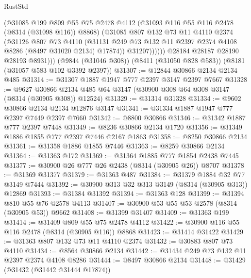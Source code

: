 \begin{lexlean}{RustStd}
\begin{coremodule}
                  (@31085
                    @199
                    @809
                    @55
                    @75
                    @2478
                    @4112
                    (@31093 @116 @55 @116 @2478 (@8314 (@31098 @116)) @8868)
                    (@31085
                      @807
                      @132
                      @73
                      @11
                      @4110
                      @2374
                      (@31126
                        @807
                        @73
                        @4110
                        (@31131
                          @249
                          @73
                          @132
                          @11
                          @2397
                          @2374
                          @4108
                          @8286
                          (@8497 @31020 @2134)
                          @17874))
                      @31207))))))
          @28184
          @28187
          @28190
          @28193
          @8931)))
    (@9844 (@31046 @308))
    (@8411 (@31050 @828 @583))
    (@8181 (@31057 @583 @102 @3392 @2397))
@31307 := @12844 @30866 @2134 @2134 @485
@31314 := @31307 @1887 @1947 @777 @2397 @3147 @2397 @7667
@31328 := @9627
    @30866
    @2134
    @485
    @64
    @3147
    (@30900 @308 @64 @308 @3147 (@8314 (@30905 @308)) @12524)
@31329 := @31314 @31328
@31334 := @9602 @30866 @2134 @2134 @12876 @3147
@31341 := @31334 @1887 @1947 @777 @2397 @7449 @2397 @7660
@31342 := @8800 @30866
@31346 := @31342 @1887 @777 @2397 @7448
@31349 := @8236 @30866 @2134 @1720
@31356 := @31349 @1886 @1855 @777 @2397 @7446 @2167 @1863
@31358 := @8250 @30866 @2134
@31361 := @31358 @1886 @1855 @7446
@31363 := @8259 @30866 @2134
@31364 := @31363 @172
@31369 := @31364 @1885 @777 @1854 @2438 @7445
@31377 := @30900 @26 @777 @26 @2438 (@8314 (@30905 @26)) @8707
@31378 := @31369 @31377
@31379 := @31363 @487
@31384 := @31379 @1884 @32 @77 @3149 @7444
@31392 := @30900 @313 @32 @313 @3149 (@8314 (@30905 @313)) @12869
@31393 := @31384 @31392
@31394 := @31363 @128
@31399 := @31394 @810 @55 @76 @2578 @4113
@31407 := @30900 @53 @55 @53 @2578 (@8314 (@30905 @53)) @9662
@31408 := @31399 @31407
@31409 := @31363 @199
@31414 := @31409 @809 @55 @75 @2478 @4112
@31422 := @30900 @116 @55 @116 @2478 (@8314 (@30905 @116)) @8868
@31423 := @31414 @31422
@31429 := @31363 @807 @132 @73 @11 @4110 @2374
@31432 := @30883 @807 @73 @4110
@31434 := @8564 @30866 @2134
@31442 := @31434 @249 @73 @132 @11 @2397 @2374 @4108 @8286
@31444 := @8497 @30866 @2134
@31448 := @31429 (@31432 (@31442 @31444 @17874))

\end{coremodule}
\end{lexlean}
